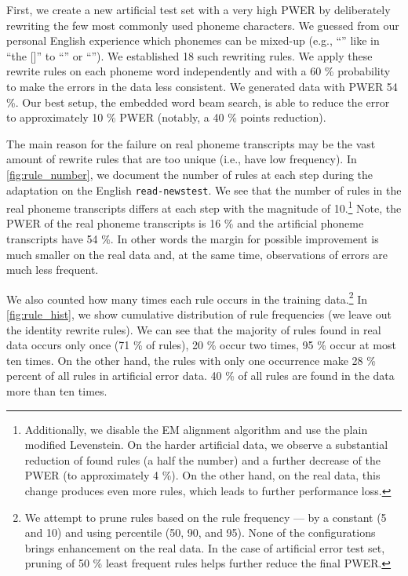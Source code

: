 First, we create a new artificial test set with a very high PWER by deliberately rewriting the few most commonly used phoneme characters. We guessed from our personal English experience which phonemes can be mixed-up (e.g., ``'' like in ``the []'' to ``'' or ``''). We established 18 such rewriting rules. We apply these rewrite rules on each phoneme word independently and with a 60 \% probability to make the errors in the data less consistent. We generated data with PWER 54 \%. Our best setup, the embedded word beam search, is able to reduce the error to approximately 10 \% PWER (notably, a 40 \% points reduction).  

The main reason for the failure on real phoneme transcripts may be the vast amount of rewrite rules that are too unique (i.e., have low frequency). In \cref{fig:rule_number}, we document the number of rules at each step during the adaptation on the English \texttt{read-newstest}. We see that the number of rules in the real phoneme transcripts differs at each step with the magnitude of 10.\footnote{Additionally, we disable the EM alignment algorithm and use the plain modified Levenstein. On the harder artificial data, we observe a substantial reduction of found rules (a half the number) and a further decrease of the PWER (to approximately 4 \%). On the other hand, on the real data, this change produces even more rules, which leads to further performance loss.} Note, the PWER of the real phoneme transcripts is 16 \% and the artificial phoneme transcripts have 54 \%. In other words the margin for possible improvement is much smaller on the real data and, at the same time, observations of errors are much less frequent.

We also counted how many times each rule occurs in the training data.\footnote{We attempt to prune rules based on the rule frequency --- by a constant (5 and 10) and using percentile (50, 90, and 95). None of the configurations brings enhancement on the real data. In the case of artificial error test set, pruning of 50 \% least frequent rules helps further reduce the final PWER.} In \cref{fig:rule_hist}, we show cumulative distribution of rule frequencies (we leave out the identity rewrite rules). We can see that the majority of rules found in real data occurs only once (71 \% of rules), 20 \% occur two times, 95 \% occur at most ten times. On the other hand, the rules with only one occurrence make 28 \% percent of all rules in artificial error data. 40 \% of all rules are found in the data more than ten times.

